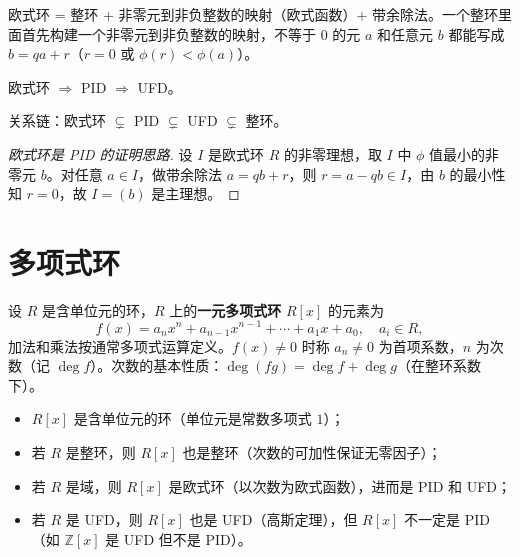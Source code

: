 \begin{note}
欧式环 = 整环 + 非零元到非负整数的映射（欧式函数）+ 带余除法。一个整环里面首先构建一个非零元到非负整数的映射，不等于 $0$ 的元 $a$ 和任意元 $b$ 都能写成 $b = qa + r$（$r=0$ 或 $\phi(r) < \phi(a)$）。
\end{note}

\begin{theorem}
欧式环 $\Rightarrow$ PID $\Rightarrow$ UFD。
\end{theorem}

\begin{note}
关系链：欧式环 $\subsetneq$ PID $\subsetneq$ UFD $\subsetneq$ 整环。
\end{note}

\begin{proof}[欧式环是 PID 的证明思路]
设 $I$ 是欧式环 $R$ 的非零理想，取 $I$ 中 $\phi$ 值最小的非零元 $b$。对任意 $a \in I$，做带余除法 $a = qb + r$，则 $r = a - qb \in I$，由 $b$ 的最小性知 $r = 0$，故 $I = (b)$ 是主理想。
\end{proof}

\section{多项式环}

\begin{definition}[一元多项式环]
设 $R$ 是含单位元的环，$R$ 上的\textbf{一元多项式环} $R[x]$ 的元素为
\[
  f(x) = a_n x^n + a_{n-1} x^{n-1} + \cdots + a_1 x + a_0, \quad a_i \in R,
\]
加法和乘法按通常多项式运算定义。$f(x) \ne 0$ 时称 $a_n \ne 0$ 为首项系数，$n$ 为次数（记 $\deg f$）。次数的基本性质：$\deg(fg) = \deg f + \deg g$（在整环系数下）。
\end{definition}

\begin{note}[一元多项式环基础知识]
\begin{itemize}
  \item $R[x]$ 是含单位元的环（单位元是常数多项式 $1$）；
  \item 若 $R$ 是整环，则 $R[x]$ 也是整环（次数的可加性保证无零因子）；
  \item 若 $R$ 是域，则 $R[x]$ 是欧式环（以次数为欧式函数），进而是 PID 和 UFD；
  \item 若 $R$ 是 UFD，则 $R[x]$ 也是 UFD（高斯定理），但 $R[x]$ 不一定是 PID（如 $\mathbb{Z}[x]$ 是 UFD 但不是 PID）。
\end{itemize}
\end{note}

